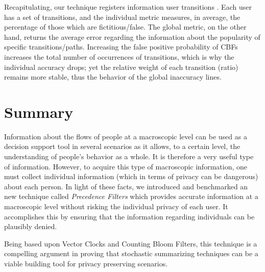 Recapitulating, our technique registers information user transitions
. Each user has a set of transitions, and the individual
metric measures, in average, the percentage of those which are
fictitious/false.  The global metric, on the other hand, returns the
average error regarding the information about the popularity of
specific transitions/paths. Increasing the false positive
probability of CBFs increases the total number of occurrences of
transitions, which is why the individual accuracy drops; yet the relative
weight of each transition (ratio) remains more stable, thus
the behavior of the global inaccuracy lines.

\section{Summary}
\label{sec:ct-summary}

Information about the flows of people at a macroscopic level can be used as
a decision support tool in several scenarios as it allows, to a
certain level, the understanding of people's behavior as a whole.  It
is therefore a very useful type of information.  However, to acquire
this type of macroscopic  information, one must collect individual
information (which in terms of privacy can be dangerous) about each
person. In light of these facts, we introduced and benchmarked an new
technique called \emph{Precedence Filters} which provides accurate
information at a macroscopic level without risking the individual
privacy of each user. It accomplishes this by ensuring that the
information regarding individuals can be plausibly denied.

Being based upon Vector Clocks and Counting Bloom Filters, this
technique is a compelling argument in proving that stochastic
summarizing techniques can be a viable building tool for privacy
preserving scenarios.


